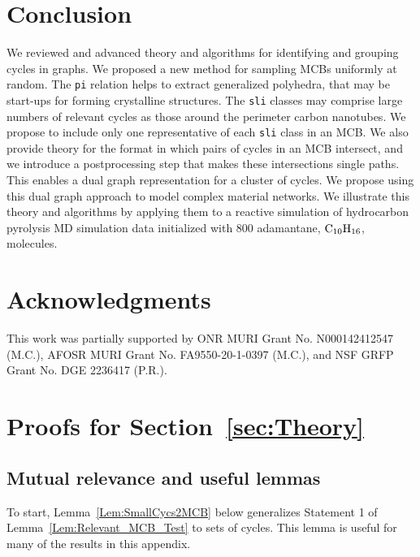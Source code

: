 \documentclass[fleqn,11pt]{article}
\begin{document}
\section{Conclusion}
\label{sec:conclusion}

We reviewed and advanced theory and algorithms for identifying and grouping cycles in graphs. 
We proposed a new method for sampling MCBs uniformly at random. The {\tt pi} relation helps to extract generalized polyhedra, that may be start-ups for forming crystalline structures. The {\tt sli} classes may comprise large numbers of relevant cycles as those around the perimeter carbon nanotubes. We propose to include only one representative of each {\tt sli} class in an MCB.
We also provide theory for the format in which pairs of cycles in an MCB intersect, and we introduce a postprocessing step that makes these intersections single paths. 
This enables a dual graph representation for a cluster of cycles. We propose using this dual graph approach to model complex material networks. 
We illustrate this theory and algorithms by applying them to a reactive simulation of hydrocarbon pyrolysis MD simulation data initialized with 800 adamantane, $\rm C_{10}H_{16}$, molecules.



\section*{Acknowledgments}
This work was partially supported by ONR MURI Grant No. N000142412547 (M.C.), AFOSR MURI Grant No. FA9550-20-1-0397 (M.C.), and NSF GRFP Grant No. DGE 2236417 (P.R.).

\appendix

\section{Proofs for Section~\ref{sec:Theory}}
\subsection{Mutual relevance and useful lemmas}
\label{app:additional_lems}

To start,
Lemma~\ref{Lem:SmallCycs2MCB} below generalizes Statement 1 of Lemma~\ref{Lem:Relevant_MCB_Test} to sets of cycles. This lemma is useful for many of the results in this appendix.
\end{document}
